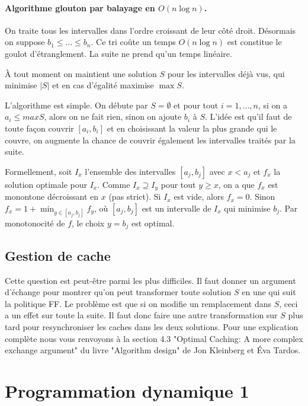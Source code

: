 \documentclass[12pt]{article}
\begin{document}
\paragraph{Algorithme glouton par balayage en $O(n\log n)$.} 

On traite tous les intervalles dans l'ordre croissant de leur côté droit. 
Désormais on suppose $b_1\leq \ldots\leq b_n$. Ce tri coûte un temps $O(n \log
n)$ est constitue le goulot d'étranglement. La suite ne prend qu'un temps
linéaire.

À tout moment on maintient une solution $S$ pour les intervalles déjà vus, qui
minimise $|S|$ et en cas d'égalité maximise $\max S$.

L'algorithme est simple.  On débute par $S=\emptyset$ et pour tout
$i=1,\ldots,n$, si on a $a_i\leq max S$, alors on ne fait rien, sinon on
ajoute $b_i$ à $S$. L'idée est qu'il faut de toute façon couvrir $[a_i,b_i]$
et en choisissant la valeur la plus grande qui le couvre, on augmente la
chance de couvrir également les intervalles traités par la suite.

Formellement, soit $I_x$ l'ensemble des intervalles $[a_j,b_j]$ avec $x<a_j$
et $f_x$ la solution optimale pour $I_x$. Comme $I_x \supseteq I_y$ pour tout
$y\geq x$, on a que $f_x$ est monontone décroissant en $x$ (pas strict).  Si
$I_x$ est vide, alors $f_x=0$. Sinon $f_x=1+\min_{y\in[a_j,b_j]} f_y$, où
$[a_j,b_j]$ est un intervalle de $I_x$ qui minimise $b_j$. Par monotonocité de
$f$, le choix $y=b_j$ est optimal.

\subsection{Gestion de cache}

Cette question est peut-être parmi les plus difficiles.  Il faut donner un
argument d'échange pour montrer qu'on peut transformer toute solution $S$ en
une qui suit la politique FF.  Le problème est que si on modifie un
remplacement dans $S$, ceci a un effet sur toute la suite.  Il faut donc faire
une autre transformation sur $S$ plus tard pour resynchroniser les caches dans
les deux solutions.  Pour une explication complète nous vous renvoyons à la
section 4.3 "Optimal Caching: A more complex exchange argument" du livre
"Algorithm design" de Jon Kleinberg et Éva Tardos.


\section{Programmation dynamique 1}
\end{document}
